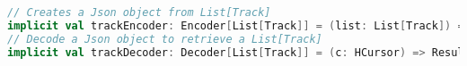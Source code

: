 \begin{lstlisting}[language=Scala, caption=Impliciti per le operazioni di codifica, label=code:coder]
// Creates a Json object from List[Track]
implicit val trackEncoder: Encoder[List[Track]] = (list: List[Track]) => Json
// Decode a Json object to retrieve a List[Track]
implicit val trackDecoder: Decoder[List[Track]] = (c: HCursor) => Result
\end{lstlisting}